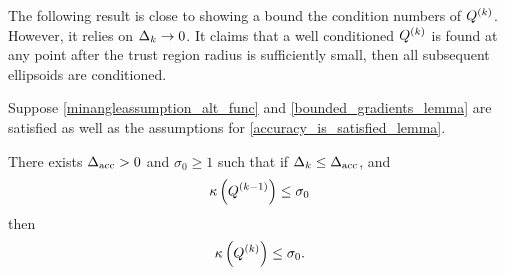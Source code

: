 The following result is close to showing a bound the condition numbers of ${Q^{(k)}}$.
However, it relies on $\Delta_k \to 0$.
It claims that a well conditioned ${Q^{(k)}}$ is found at any point after the trust region radius is sufficiently small, then all subsequent ellipsoids are conditioned.


\begin{lemma}
Suppose \cref{minangleassumption_alt_func} and \cref{bounded_gradients_lemma} are satisfied as well as the assumptions for \cref{accuracy_is_satisfied_lemma}.

There exists ${\Delta_{\textrm{acc}}} > 0$ and $\sigma_0 \ge 1$ such that if $\Delta_k \le {\Delta_{\textrm{acc}}}$, and
\begin{align}
{\kappa} \left( Q^{(k-1)} \right) \le \sigma_0 \label{idk_alt_proof_statement1}
\end{align}
then 
\begin{align}
{\kappa} \left( {Q^{(k)}} \right) \le \sigma_0. \label{idk_alt_proof_statement2}
\end{align}
\end{lemma}



